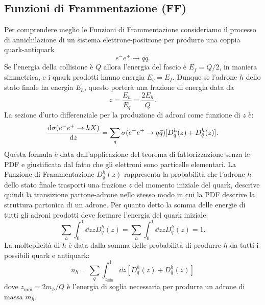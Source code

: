     \subsection{Funzioni di Frammentazione (FF)}
        Per comprendere meglio le Funzioni di Frammentazione consideriamo il processo di annichilazione di un sistema elettrone-positrone per produrre una coppia quark-antiquark~\cite{Vogt_2007}
        \begin{equation*}
            e^{-} e^{+} \to q \bar{q}.
        \end{equation*}
        Se l'energia della collisione è $Q$ allora l'energia del fascio è $E_f = Q/2$, in maniera simmetrica, e i quark prodotti hanno energia $E_q = E_f$. Dunque se l'adrone $h$ dello stato finale ha energia $E_h$, questo porterà una frazione di energia data da
        \begin{equation*}
            z = \frac{E_h}{E_q} = \frac{2 E_h}{Q}.
        \end{equation*}
        La sezione d'urto differenziale per la produzione di adroni come funzione di $z$ è:
        \begin{equation*}
            \dv{\sigma(e^{-} e^{+} \to h X)}{z} = \sum_{q}{\sigma(e^{-}e^{+} \to q \bar{q})[D_{q}^{h}(z) + D_{\bar{q}}^{h}(z)]}.
        \end{equation*}
        Questa formula è data dall'applicazione del teorema di fattorizzazione senza le PDF e giustificata dal fatto che gli elettroni sono particelle elementari. La Funzione di Frammentazione $D_{q}^{h}(z)$ rappresenta la probabilità che l'adrone $h$ dello stato finale trasporti una frazione $z$ del momento iniziale del quark, descrive quindi la transizione partone-adrone nello stesso modo in cui la PDF descrive la struttura partonica di un adrone. Per quanto detto la somma delle energie di tutti gli adroni prodotti deve formare l'energia del quark iniziale:
        \begin{equation*}
            \sum_{h}{\int_{0}^{1}{\dd{z} z D_{q}^{h}(z)}} = \sum_{h}{ \int_{0}^{1}{\dd{z} z D_{\bar{q}}^{h}(z)}} = 1.
        \end{equation*}
        La molteplicità di $h$ è data dalla somma delle probabilità di produrre $h$ da tutti i possibili quark e antiquark:
        \begin{equation*}
            n_{h} = \sum_{q}{\int_{z_{\min}}^{1} \dd{z} [D_{q}^{h}(z) + D_{\bar{q}}^{h}(z)]}
        \end{equation*}
        dove $z_{\min} = 2 m_{h} / Q$ è l'energia di soglia necessaria per produrre un adrone di massa $m_{h}$.

